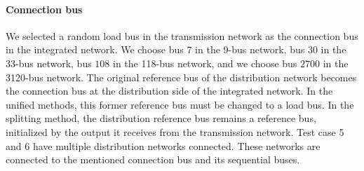 \documentclass[10pt,journal]{article}
\begin{document}
\paragraph{Connection bus}
We selected a random load bus in the transmission network as the connection bus in the integrated network. We choose bus $7$ in the 9-bus network, bus $30$ in the 33-bus network, bus $108$ in the 118-bus network, and we choose bus $2700$ in the 3120-bus network. The original reference bus of the distribution network becomes the connection bus at the distribution side of the integrated network. In the unified methods, this former reference bus must be changed to a load bus.  In the splitting method, the distribution reference bus remains a reference bus, initialized by the output it receives from the transmission network. 
Test case 5 and 6 have multiple distribution networks connected. These networks are connected to the mentioned connection bus and its sequential buses. 
\end{document}
